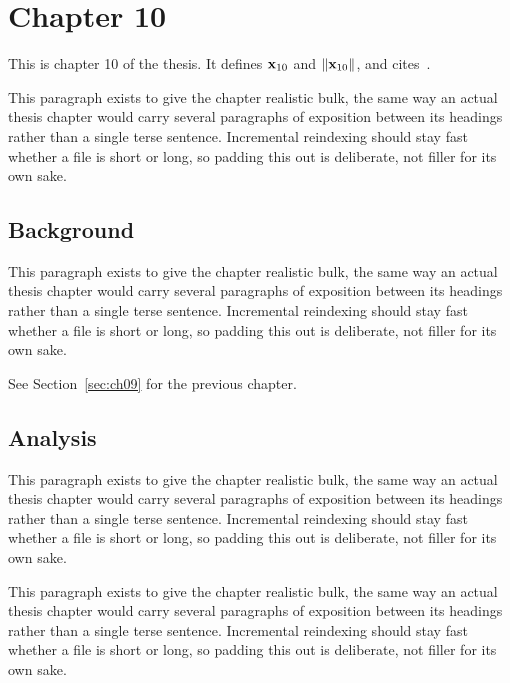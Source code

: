 \section{Chapter 10}
\label{sec:ch10}

This is chapter 10 of the thesis. It defines $\mathbf{x}_{10}$ and $\lVert \mathbf{x}_{10} \rVert$, and cites~\cite{ref1}.

This paragraph exists to give the chapter realistic bulk, the same way an actual thesis chapter would carry several paragraphs of exposition between its headings rather than a single terse sentence. Incremental reindexing should stay fast whether a file is short or long, so padding this out is deliberate, not filler for its own sake.

\subsection{Background}
\label{sec:ch10:background}

This paragraph exists to give the chapter realistic bulk, the same way an actual thesis chapter would carry several paragraphs of exposition between its headings rather than a single terse sentence. Incremental reindexing should stay fast whether a file is short or long, so padding this out is deliberate, not filler for its own sake.

See Section~\ref{sec:ch09} for the previous chapter.

\subsection{Analysis}
\label{sec:ch10:analysis}

This paragraph exists to give the chapter realistic bulk, the same way an actual thesis chapter would carry several paragraphs of exposition between its headings rather than a single terse sentence. Incremental reindexing should stay fast whether a file is short or long, so padding this out is deliberate, not filler for its own sake.

This paragraph exists to give the chapter realistic bulk, the same way an actual thesis chapter would carry several paragraphs of exposition between its headings rather than a single terse sentence. Incremental reindexing should stay fast whether a file is short or long, so padding this out is deliberate, not filler for its own sake.
